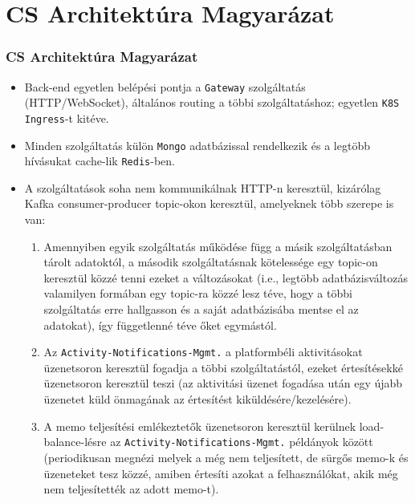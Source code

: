 \section{CS Architektúra Magyarázat}

\begin{frame}
    \frametitle{CS Architektúra Magyarázat}

    \begin{itemize}
        \item Back-end egyetlen belépési pontja a \texttt{Gateway} szolgáltatás (HTTP/WebSocket), általános routing a többi szolgáltatáshoz; egyetlen \texttt{K8S Ingress}-t kitéve.
        \item Minden szolgáltatás külön \texttt{Mongo} adatbázissal rendelkezik és a legtöbb hívásukat cache-lik \texttt{Redis}-ben.
        \item A szolgáltatások soha nem kommunikálnak HTTP-n keresztül, kizárólag Kafka consumer-producer topic-okon keresztül, amelyeknek több szerepe is van:
              \begin{enumerate}
                  \item Amennyiben egyik szolgáltatás működése függ a másik szolgáltatásban tárolt adatoktól, a második szolgáltatásnak kötelessége egy topic-on keresztül közzé tenni ezeket a változásokat (i.e., legtöbb adatbázisváltozás valamilyen formában egy topic-ra közzé lesz téve, hogy a többi szolgáltatás erre hallgasson és a saját adatbázisába mentse el az adatokat), így függetlenné téve őket egymástól.
                  \item Az \texttt{Activity-Notifications-Mgmt.} a platformbéli aktivitásokat üzenetsoron keresztül fogadja a többi szolgáltatástól, ezeket értesítésekké üzenetsoron keresztül teszi (az aktivitási üzenet fogadása után egy újabb üzenetet küld önmagának az értesítést kiküldésére/kezelésére).
                  \item A memo teljesítési emlékeztetők üzenetsoron keresztül kerülnek load-balance-lésre az \texttt{Activity-Notifications-Mgmt.} példányok között (periodikusan megnézi melyek a még nem teljesített, de sürgős memo-k és üzeneteket tesz közzé, amiben értesíti azokat a felhasználókat, akik még nem teljesítették az adott memo-t).
              \end{enumerate}
    \end{itemize}
\end{frame}

